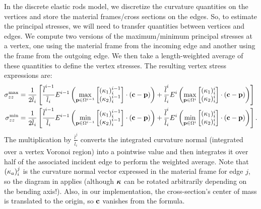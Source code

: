 \documentclass[10pt]{article}
\begin{document}
In the discrete elastic rods model, we discretize the curvature quantities on
the vertices and store the material frames/cross sections on the edges. So, to
estimate the principal stresses, we will need to transfer quantities between
vertices and edges. We compute two versions of the maximum/minimum principal
stresses at a vertex, one using the material frame from the incoming edge and
another using the frame from the outgoing edge. We then take a length-weighted
average of these quantities to define the vertex stresses. The resulting vertex
stress expressions are:
\begin{align*}
\sigma_{zz}^\text{max} &=
    \frac{1}{2 \overline{l}_i} \left[
        \frac{\overline{l}^{i - 1}}{\overline{l}_{i}} E^{i - 1} \left(\max_{{\bf p} \in \Omega^{i - 1}} \begin{bmatrix} (\kappa_{1})_i^{i - 1} \\ (\kappa_{2})_i^{i - 1} \end{bmatrix} \cdot ({\bf c} - {\bf p}) \right) +
        \frac{\overline{l}^{i    }}{\overline{l}_{i}} E^{i    } \left(\max_{{\bf p} \in \Omega^{i    }} \begin{bmatrix} (\kappa_{1})_i^{i    } \\ (\kappa_{2})_i^{i    } \end{bmatrix} \cdot ({\bf c} - {\bf p}) \right)
    \right] \\
\sigma_{zz}^\text{min} &=
    \frac{1}{2 \overline{l}_i} \left[
        \frac{\overline{l}^{i - 1}}{\overline{l}_{i}} E^{i - 1} \left(\min_{{\bf p} \in \Omega^{i - 1}} \begin{bmatrix} (\kappa_{1})_i^{i - 1} \\ (\kappa_{2})_i^{i - 1} \end{bmatrix} \cdot ({\bf c} - {\bf p}) \right) +
        \frac{\overline{l}^{i    }}{\overline{l}_{i}} E^{i    } \left(\min_{{\bf p} \in \Omega^{i    }} \begin{bmatrix} (\kappa_{1})_i^{i    } \\ (\kappa_{2})_i^{i    } \end{bmatrix} \cdot ({\bf c} - {\bf p}) \right)
    \right].
\end{align*}
The multiplication by $\frac{\overline{l}^j}{\overline{l}_i}$ converts the integrated curvature normal (integrated over
a vertex Voronoi region) into a pointwise value and then integrates it over half of the associated incident edge to perform
the weighted average.
Note that $(\kappa_{a})_i^{j}$ is the curvature normal vector expressed in the material
frame for edge $j$, so the diagram in  applies (although $\bm{\kappa}$
can be rotated arbitrarily depending on the bending axis!). Also, in our
implementation, the cross-section's center of mass is translated to the origin,
so ${\bf c}$ vanishes from the formula.
\end{document}
